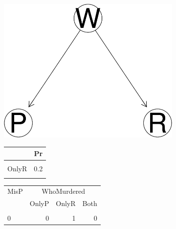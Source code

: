 \documentclass[
  10pt,
]{scrartcl}
\begin{document}
\begin{figure}[H]
\begin{subfigure}[!ht]{0.4\textwidth}

\begin{center}\includegraphics{coherencePaper32_files/figure-latex/unnamed-chunk-20-1} \end{center}
\end{subfigure} \hfill
\begin{subfigure}[!ht]{0.4\textwidth}

\centering\begingroup\fontsize{9}{11}\selectfont
\begin{tabular}{lr}
\toprule
  & Pr\\
\midrule
\cellcolor{gray!6}{OnlyP} & \cellcolor{gray!6}{0.2}\\
OnlyR & 0.2\\
\cellcolor{gray!6}{Both} & \cellcolor{gray!6}{0.6}\\
\bottomrule
\end{tabular}




\begin{tabular}{lrrr}
\toprule
\multicolumn{1}{c}{MisP} & \multicolumn{3}{c}{WhoMurdered} \\
  & OnlyP & OnlyR & Both\\
\midrule
\cellcolor{gray!6}{1} & \cellcolor{gray!6}{1} & \cellcolor{gray!6}{0} & \cellcolor{gray!6}{1}\\
0 & 0 & 1 & 0\\
\bottomrule
\end{tabular}


\end{subfigure}
\end{figure}
\end{document}
